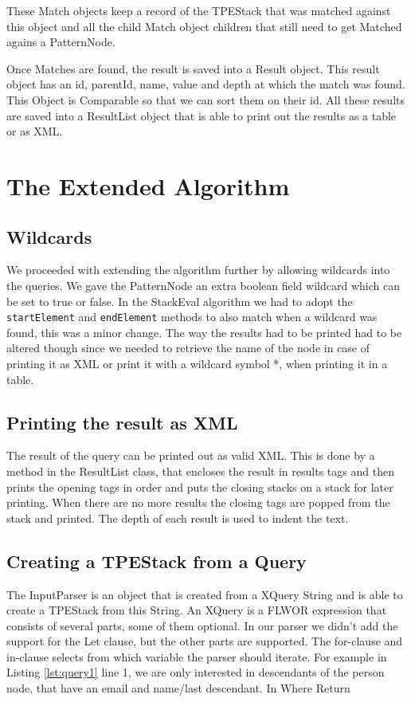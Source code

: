 \documentclass[11pt]{article}
\begin{document}
These Match objects keep a record of the TPEStack that was matched against this object and all the child Match object children that still need to get Matched agains a PatternNode. 

Once Matches are found, the result is saved into a Result object. This result object has an id, parentId, name, value and depth at which the match was found. This Object is Comparable so that we can sort them on their id. All these results are saved into a ResultList object that is able to print out the results as a table or as XML. 

%

\newpage
\section{The Extended Algorithm}
\subsection{Wildcards}
We proceeded with extending the algorithm further by allowing wildcards into the queries. We gave the PatternNode an extra boolean field wildcard which can be set to true or false. In the StackEval algorithm we had to adopt the \lstinline{startElement} and \lstinline{endElement} methods to also match when a wildcard was found, this was a minor change. The way the results had to be printed had to be altered though since we needed to retrieve the name of the node in case of printing it as XML or print it with a wildcard symbol *, when printing it in a table.

\subsection{Printing the result as XML}
The result of the query can be printed out as valid XML. This is done by a method in the ResultList class, that encloses the result in results tags and then prints the opening tags in order and puts the closing stacks on a stack for later printing. When there are no more results the closing tags are popped from the stack and printed. The depth of each result is used to indent the text.

\subsection{Creating a TPEStack from a Query}
The InputParser is an object that is created from a XQuery String and is able to create a TPEStack from this String. An XQuery is a FLWOR expression that consists of several parts, some of them optional. In our parser we didn't add the support for the Let clause, but the other parts are supported.
The for-clause and in-clause selects from which variable the parser should iterate. For example in Listing \ref{lst:query1} line 1, we are only interested in descendants of the person node, that have an email and name/last descendant. 
In
Where
Return
\end{document}
